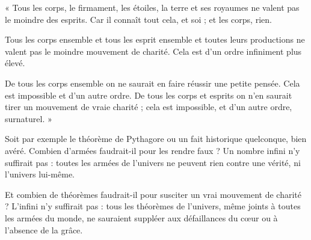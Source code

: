 \vspace{0.5cm}

{\footnotesize 
« Tous les corps, le firmament, les étoiles, la terre et ses royaumes ne valent pas le
moindre des esprits. Car il connaît tout cela, et soi ; et les corps, rien.

Tous les corps ensemble et tous les esprit ensemble et toutes leurs productions ne
valent pas le moindre mouvement de charité. Cela est d’un ordre infiniment plus élevé.

De tous les corps ensemble on ne saurait en faire réussir une petite pensée. Cela est
impossible et d’un autre ordre. De tous les corps et esprits on n’en saurait tirer un mouvement
de vraie charité ; cela est impossible, et d’un autre ordre, surnaturel. »
}

\vspace{0.5cm}

Soit par exemple le théorème de Pythagore ou un fait historique quelconque,
bien avéré. Combien d’armées faudrait-il pour les rendre faux ? Un
nombre infini n’y suffirait pas : toutes les armées de l’univers ne peuvent rien
contre une vérité, ni l’univers lui-même.

Et combien de théorèmes faudrait-il pour susciter un vrai mouvement de
charité ? L’infini n’y suffirait pas : tous les théorèmes de l’univers, même joints
à toutes les armées du monde, ne sauraient suppléer aux défaillances du cœur
ou à l’absence de la grâce.

